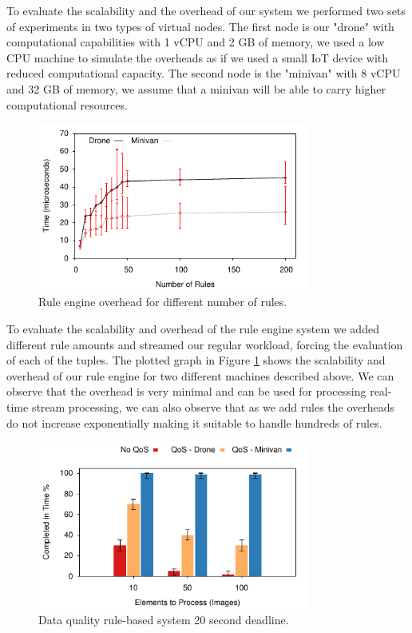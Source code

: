 To evaluate the scalability and the overhead of our system we performed two sets of experiments in two types of virtual nodes. The first node is our "drone" with computational capabilities with 1 vCPU and 2 GB of memory, we used a low CPU machine to simulate the overheads as if we used a small IoT device with reduced computational capacity. The second node is the "minivan" with 8 vCPU and 32 GB of memory, we assume that a minivan will be able to carry higher computational resources.

\begin{figure}[h!]
  \centering
  \includegraphics[width=0.8\textwidth]{Results/RuleEngine}
  \caption{Rule engine overhead for different number of rules.}
  \label{fig:RuleEngine}
\end{figure}

To evaluate the scalability and overhead of the rule engine system we added different rule amounts and streamed our regular workload, forcing the evaluation of each of the tuples. The plotted graph in Figure  \ref{fig:RuleEngine} shows the scalability and overhead of our rule engine for two different machines described above. We can observe that the overhead is very minimal and can be used for processing real-time stream processing, we can also observe that as we add rules the overheads do not increase exponentially making it suitable to handle hundreds of rules.

\begin{figure}[h!]
  \centering
  \includegraphics[width=0.8\textwidth]{Results/QoS}
  \caption{Data quality rule-based system 20 second deadline.}
  \label{fig:QoS}
\end{figure}

